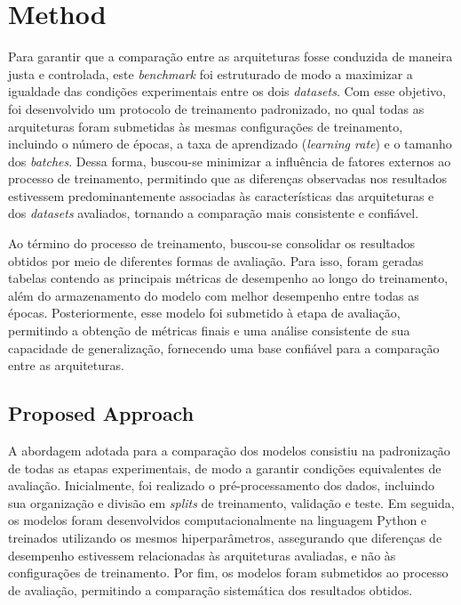 \documentclass[11pt,a4paper]{article}
\begin{document}

\section{Method}
\label{sec:method}

Para garantir que a comparação entre as arquiteturas fosse conduzida de maneira justa e controlada, este \textit{benchmark} foi estruturado de modo a maximizar a igualdade das condições experimentais entre os dois \textit{datasets}. Com esse objetivo, foi desenvolvido um protocolo de treinamento padronizado, no qual todas as arquiteturas foram submetidas às mesmas configurações de treinamento, incluindo o número de épocas, a taxa de aprendizado (\textit{learning rate}) e o tamanho dos \textit{batches}. Dessa forma, buscou-se minimizar a influência de fatores externos ao processo de treinamento, permitindo que as diferenças observadas nos resultados estivessem predominantemente associadas às características das arquiteturas e dos \textit{datasets} avaliados, tornando a comparação mais consistente e confiável.

Ao término do processo de treinamento, buscou-se consolidar os resultados obtidos por meio de diferentes formas de avaliação. Para isso, foram geradas tabelas contendo as principais métricas de desempenho ao longo do treinamento, além do armazenamento do modelo com melhor desempenho entre todas as épocas. Posteriormente, esse modelo foi submetido à etapa de avaliação, permitindo a obtenção de métricas finais e uma análise consistente de sua capacidade de generalização, fornecendo uma base confiável para a comparação entre as arquiteturas.


\subsection{Proposed Approach}
\label{sec:approach}

A abordagem adotada para a comparação dos modelos consistiu na padronização de todas as etapas experimentais, de modo a garantir condições equivalentes de avaliação. Inicialmente, foi realizado o pré-processamento dos dados, incluindo sua organização e divisão em \textit{splits} de treinamento, validação e teste. Em seguida, os modelos foram desenvolvidos computacionalmente na linguagem Python e treinados utilizando os mesmos hiperparâmetros, assegurando que diferenças de desempenho estivessem relacionadas às arquiteturas avaliadas, e não às configurações de treinamento. Por fim, os modelos foram submetidos ao processo de avaliação, permitindo a comparação sistemática dos resultados obtidos.
\end{document}
